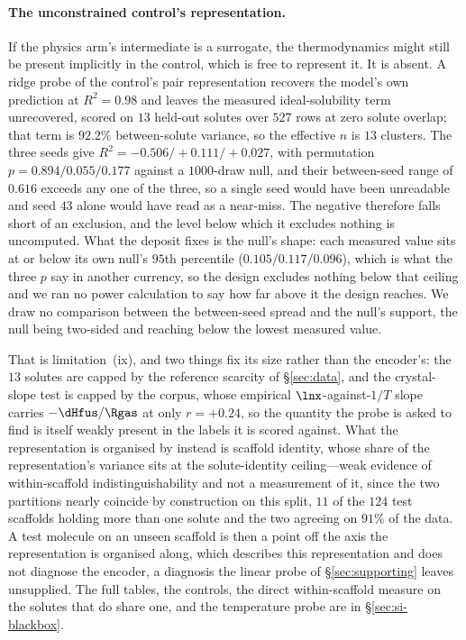 \paragraph{The unconstrained control's representation.} If the physics arm's intermediate is a
surrogate, the thermodynamics might still be present implicitly in the control, which is free to
represent it. It is absent. A ridge probe of the control's pair representation recovers the model's
own prediction at $R^{2}=0.98$ and leaves the measured ideal-solubility term unrecovered, scored on
$13$ held-out solutes over $527$ rows at zero solute overlap; that term is $92.2\%$ between-solute
variance, so the effective $n$ is $13$ clusters. The three seeds give
$R^{2}=-0.506/{+}0.111/{+}0.027$, with permutation $p=0.894/0.055/0.177$ against a $1000$-draw null,
and their between-seed range of $0.616$ exceeds any one of the three, so a single seed would have
been unreadable and seed $43$ alone would have read as a near-miss. The negative therefore falls
short of an exclusion, and the level below which it excludes nothing is uncomputed. What the deposit
fixes is the null's shape: each measured value sits at or below its own null's $95$th percentile
($0.105/0.117/0.096$), which is what the three $p$ say in another currency, so the design excludes
nothing below that ceiling and we ran no power calculation to say how far above it the design
reaches. We draw no comparison between the between-seed spread and the null's support, the null
being two-sided and reaching below the lowest measured value.

That is limitation~(ix), and two things fix its size rather than the encoder's: the $13$ solutes are
capped by the reference scarcity of \S\ref{sec:data}, and the crystal-slope test is capped by the
corpus, whose empirical $\lnx$-against-$1/T$ slope carries $-\dHfus/\Rgas$ at only $r=+0.24$, so the
quantity the probe is asked to find is itself weakly present in the labels it is scored against.
What the representation is organised by instead is scaffold identity, whose share of the
representation's variance sits at the solute-identity ceiling---weak evidence of within-scaffold
indistinguishability and not a measurement of it, since the two partitions nearly coincide by
construction on this split, $11$ of the $124$ test scaffolds holding more than one solute and the
two agreeing on $91\%$ of the data. A test molecule on an unseen scaffold is then a point off the
axis the representation is organised along, which describes this representation and does not
diagnose the encoder, a diagnosis the linear probe of \S\ref{sec:supporting} leaves unsupplied. The
full tables, the controls, the direct within-scaffold measure on the solutes that do share one, and
the temperature probe are in \S\ref{sec:si-blackbox}.
